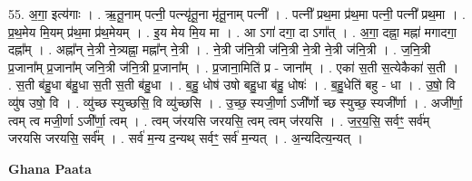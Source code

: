 \documentclass[17pt]{extarticle}
\begin{document}
55. अ॒गा॒ इत्य॑गाः । . ऋ॒तू॒नाम् पत्नी॒ पत्न्यृ॑तू॒ना मृ॑तू॒नाम् पत्नी᳚ । . पत्नी᳚ प्रथ॒मा प्र॑थ॒मा पत्नी॒ पत्नी᳚ प्रथ॒मा । . प्र॒थ॒मेय मि॒यम् प्र॑थ॒मा प्र॑थ॒मेयम् । . इ॒य मेय मि॒य मा । . आ ऽगा॑ दगा॒ दा ऽगा᳚त् । . अ॒गा॒ दह्ना॒ मह्ना॑ मगादगा॒ दह्ना᳚म् । . अह्ना᳚न् ने॒त्री ने॒त्र्यह्ना॒ मह्ना᳚न् ने॒त्री । . ने॒त्री ज॑नि॒त्री ज॑नि॒त्री ने॒त्री ने॒त्री ज॑नि॒त्री । . ज॒नि॒त्री प्र॒जाना᳚म् प्र॒जाना᳚म् जनि॒त्री ज॑नि॒त्री प्र॒जाना᳚म् । . प्र॒जाना॒मिति॑ प्र - जाना᳚म् । . एका॑ स॒ती स॒त्येकैका॑ स॒ती । . स॒ती ब॑हु॒धा ब॑हु॒धा स॒ती स॒ती ब॑हु॒धा । . ब॒हु॒ धोष॑ उषो बहु॒धा ब॑हु॒ धोषः॑ । . ब॒हु॒धेति॑ बहु - धा । . उ॒षो॒ वि व्यु॑ष उषो॒ वि । . व्यु॑च्छ स्युच्छसि॒ वि व्यु॑च्छसि । . उ॒च्छ॒ स्यजी॒र्णा ऽजी᳚र्णो च्छ स्युच्छ॒ स्यजी᳚र्णा । . अजी᳚र्णा॒ त्वम् त्व मजी॒र्णा ऽजी᳚र्णा॒ त्वम् । . त्वम् ज॑रयसि जरयसि॒ त्वम् त्वम् ज॑रयसि । . ज॒र॒य॒सि॒ सर्वꣳ॒॒ सर्व॑म् जरयसि जरयसि॒ सर्व᳚म् । . सर्व॑ म॒न्य द॒न्यथ् सर्वꣳ॒॒ सर्व॑ म॒न्यत् । . अ॒न्यदित्य॒न्यत् । \newline

\textbf{Ghana Paata } \newline
\end{document}
